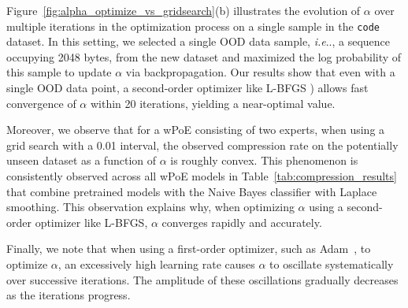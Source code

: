 \documentclass[11pt]{article}
\makeatletter
\DeclareRobustCommand\onedot{\futurelet\@let@token\@onedot}
\def\@onedot{\ifx\@let@token.\else.\null\fi\xspace}
\def\ie{\emph{i.e}\onedot} \def\Ie{\emph{I.e}\onedot}
\makeatother
\begin{document}
Figure~\ref{fig:alpha_optimize_vs_gridsearch}(b) illustrates the evolution of $\alpha$ over multiple iterations in the optimization process on a single sample in the \texttt{code} dataset. 
In this setting, we selected a single OOD data sample, \ie, a sequence occupying 2048 bytes, from the new dataset and maximized the log probability of this sample to update $\alpha$ via backpropagation. 
Our results show that even with a single OOD data point, a second-order optimizer like L-BFGS \cite{lbfgs}) allows fast convergence of $\alpha$ within 20 iterations, yielding a near-optimal value.

Moreover, we observe that for a wPoE consisting of two experts, when using a grid search with a 0.01 interval, the observed compression rate on the potentially unseen dataset as a function of $\alpha$ is roughly convex. 
This phenomenon is consistently observed across all wPoE models in Table~\ref{tab:compression_results} that combine pretrained models with the Naive Bayes classifier with Laplace smoothing. 
This observation explains why, when optimizing $\alpha$ using a second-order optimizer like L-BFGS, $\alpha$ converges rapidly and accurately.

Finally, we note that when using a first-order optimizer, such as Adam~\citep{adam}, to optimize $\alpha$, an excessively high learning rate causes $\alpha$ to oscillate systematically over successive iterations. 
The amplitude of these oscillations gradually decreases as the iterations progress.
\end{document}
